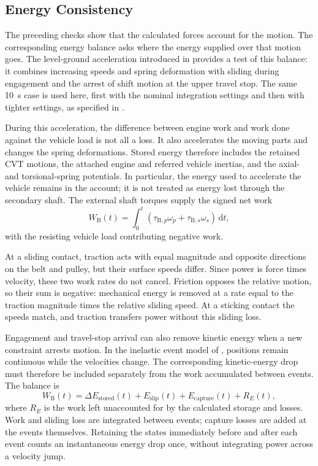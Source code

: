 \documentclass[11pt]{report}
\numberwithin{equation}{section}
\newcommand{\dd}{\,\mathrm{d}}
\begin{document}
\subsection{Energy Consistency}
\label{sec:results_energy_consistency}

The preceding checks show that the calculated forces account for the motion.
The corresponding energy balance asks where the energy supplied over that
motion goes. The level-ground acceleration introduced in
 provides a test of this balance:
it combines increasing speeds and spring deformation with sliding during
engagement and the arrest of shift motion at the upper travel stop. The same
\SI{10}{s} case is used here, first with the nominal integration settings and
then with tighter settings, as specified in
.

During this acceleration, the difference between engine work and work done
against the vehicle load is not all a loss. It also accelerates the moving
parts and changes the spring deformations. Stored energy therefore includes
the retained CVT motions, the attached engine and referred vehicle inertias,
and the axial- and torsional-spring potentials. In particular, the energy
used to accelerate the vehicle remains in the account; it is not treated as
energy lost through the secondary shaft. The external shaft torques supply
the signed net work
\begin{equation}
  W_{\mathrm B}(t)
  =\int_0^t
    \left(\tau_{\mathrm B,p}\omega_p+
          \tau_{\mathrm B,s}\omega_s\right)\dd t,
  \label{eq:verification_boundary_work}
\end{equation}
with the resisting vehicle load contributing negative work.

At a sliding contact, traction acts with equal magnitude and opposite
directions on the belt and pulley, but their surface speeds differ. Since
power is force times velocity, these two work rates do not cancel. Friction
opposes the relative motion, so their sum is negative: mechanical energy is
removed at a rate equal to the traction magnitude times the relative sliding
speed. At a sticking contact the speeds match, and traction transfers power
without this sliding loss.

Engagement and travel-stop arrival can also remove kinetic energy when a
new constraint arrests motion. In the inelastic event model of
, positions remain continuous while the
velocities change. The corresponding kinetic-energy drop must therefore be
included separately from the work accumulated between events. The balance is
\begin{equation}
  W_{\mathrm B}(t)
  =\Delta E_{\mathrm{stored}}(t)
   +E_{\mathrm{slip}}(t)+E_{\mathrm{capture}}(t)+R_E(t),
  \label{eq:verification_energy_balance}
\end{equation}
where \(R_E\) is the work left unaccounted for by the calculated storage and
losses. Work and sliding loss are integrated between events; capture losses
are added at the events themselves. Retaining the states immediately before
and after each event counts an instantaneous energy drop once, without
integrating power across a velocity jump.
\end{document}
